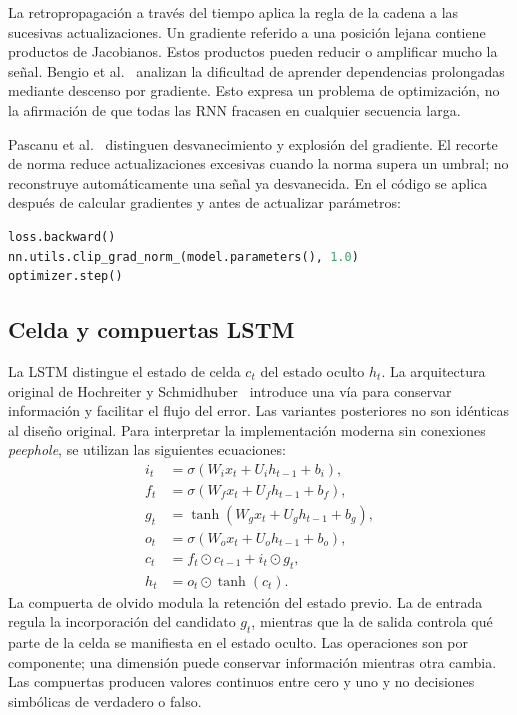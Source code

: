 La retropropagación a través del tiempo aplica la regla de la cadena a
las sucesivas actualizaciones. Un gradiente referido a una posición
lejana contiene productos de Jacobianos. Estos productos pueden reducir
o amplificar mucho la señal. Bengio et al.~\cite{bengio1994} analizan la
dificultad de aprender dependencias prolongadas mediante descenso por
gradiente. Esto expresa un problema de optimización, no la afirmación
de que todas las RNN fracasen en cualquier secuencia larga.

Pascanu et al.~\cite{pascanu2013} distinguen desvanecimiento y explosión
del gradiente. El recorte de norma reduce actualizaciones excesivas
cuando la norma supera un umbral; no reconstruye automáticamente una
señal ya desvanecida. En el código se aplica después de calcular
gradientes y antes de actualizar parámetros:
\begin{lstlisting}[language=Python]
loss.backward()
nn.utils.clip_grad_norm_(model.parameters(), 1.0)
optimizer.step()
\end{lstlisting}

\subsection{Celda y compuertas LSTM}
La LSTM distingue el estado de celda $c_t$ del estado oculto $h_t$.
La arquitectura original de Hochreiter y Schmidhuber~\cite{hochreiter1997}
introduce una vía para conservar información y facilitar el flujo del
error. Las variantes posteriores no son idénticas al diseño original.
Para interpretar la implementación moderna sin conexiones \emph{peephole},
se utilizan las siguientes ecuaciones:
\begin{align}
 i_t&=\sigma(W_i x_t+U_i h_{t-1}+b_i),\\
 f_t&=\sigma(W_f x_t+U_f h_{t-1}+b_f),\\
 g_t&=\tanh(W_g x_t+U_g h_{t-1}+b_g),\\
 o_t&=\sigma(W_o x_t+U_o h_{t-1}+b_o),\\
 c_t&=f_t\odot c_{t-1}+i_t\odot g_t,\\
 h_t&=o_t\odot\tanh(c_t).
\end{align}
La compuerta de olvido modula la retención del estado previo. La de
entrada regula la incorporación del candidato $g_t$, mientras que la de
salida controla qué parte de la celda se manifiesta en el estado oculto.
Las operaciones son por componente; una dimensión puede conservar
información mientras otra cambia. Las compuertas producen valores
continuos entre cero y uno y no decisiones simbólicas de verdadero o falso.

